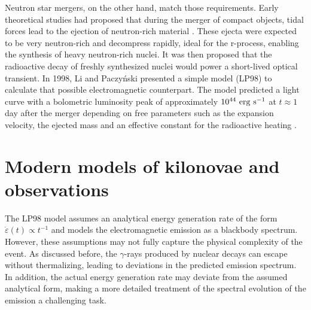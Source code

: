 Neutron star mergers, on the other hand, match those requirements.
Early theoretical studies had proposed that during the merger of compact objects, tidal forces lead to the ejection of neutron-rich material \cite{lattimer_tidal_1976}.
These ejecta were expected to be very neutron-rich and decompress rapidly, ideal for the r-process, enabling the synthesis of heavy neutron-rich nuclei.
It was then proposed that the radioactive decay of freshly synthesized nuclei would power a short-lived optical transient.
In 1998, Li and Paczyński presented a simple model (LP98) to calculate that possible electromagnetic counterpart.
The model predicted a light curve with a bolometric luminosity peak of approximately $10^{44}\ \rm erg\ \rm s^{-1}$ at $t\approx 1$ day after the merger depending on free parameters such as the expansion velocity, the ejected mass and an effective constant for the radioactive heating \cite{li_transient_1998}.


\section{Modern models of kilonovae and observations}

The LP98 model assumes an analytical energy generation rate of the form $\dot\varepsilon(t) \propto t^{-1}$ and models the electromagnetic emission as a blackbody spectrum.
However, these assumptions may not fully capture the physical complexity of the event.
As discussed before, the $\gamma$-rays produced by nuclear decays can escape without thermalizing, leading to deviations in the predicted emission spectrum.
In addition, the actual energy generation rate may deviate from the assumed analytical form, making a more detailed treatment of the spectral evolution of the emission a challenging task.

